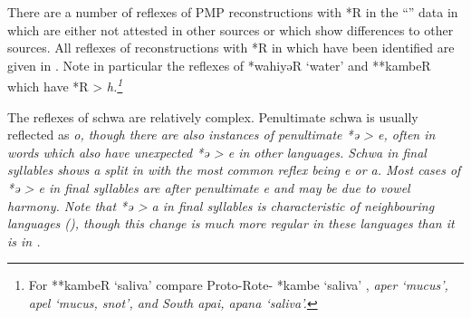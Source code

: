 \newpage
There are a number of reflexes of PMP reconstructions with *R
in the ``'' data in \citet{Tauern1931} which are either not
attested in other sources or which show differences to other sources.
All reflexes of reconstructions with *R in \citet{Tauern1931}
which have been identified are given in .
Note in particular the reflexes of *wahiyəR ‘water’
and **kambeR which have *R > \it{h}.\footnote{
		For **kambeR ‘saliva’ compare Proto-Rote-
		*kambe ‘saliva’ \citep[192]{Edwards2021},
		 \it{aper} ‘mucus’,  \it{apel} ‘mucus,
		snot’, and South  \it{apai},
		\it{apana} ‘saliva’.}
\\


The reflexes of schwa are relatively complex.
Penultimate schwa is usually reflected as \it{o},
though there are also instances of penultimate *ə > \it{e},
often in words which also have unexpected *ə > \it{e} in other  languages.
Schwa in final syllables shows a split in  with the most
common reflex being \it{e} or \it{a}.
Most cases of *ə > \it{e} in final syllables are after penultimate
\it{e} and may be due to vowel harmony.
Note that *ə > \it{a} in final syllables is characteristic of
neighbouring  languages (),
though this change is much more regular in these 
languages than it is in .

